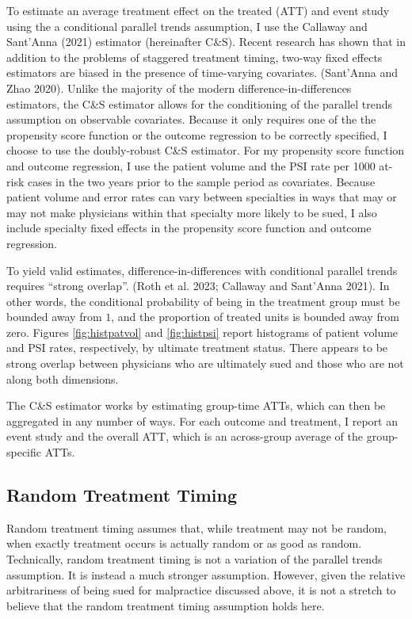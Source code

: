 \documentclass[
  12pt,
]{article}
\begin{document}
To estimate an average treatment effect on the treated (ATT) and event study using the a conditional parallel trends assumption, I use the Callaway and Sant'Anna (2021) estimator (hereinafter C\&S). Recent research has shown that in addition to the problems of staggered treatment timing, two-way fixed effects estimators are biased in the presence of time-varying covariates. (Sant'Anna and Zhao 2020). Unlike the majority of the modern difference-in-differences estimators, the C\&S estimator allows for the conditioning of the parallel trends assumption on observable covariates. Because it only requires one of the the propensity score function or the outcome regression to be correctly specified, I choose to use the doubly-robust C\&S estimator. For my propensity score function and outcome regression, I use the patient volume and the PSI rate per 1000 at-risk cases in the two years prior to the sample period as covariates. Because patient volume and error rates can vary between specialties in ways that may or may not make physicians within that specialty more likely to be sued, I also include specialty fixed effects in the propensity score function and outcome regression.

To yield valid estimates, difference-in-differences with conditional parallel trends requires ``strong overlap''. (Roth et al. 2023; Callaway and Sant'Anna 2021). In other words, the conditional probability of being in the treatment group must be bounded away from \(1\), and the proportion of treated units is bounded away from zero. Figures \ref{fig:histpatvol} and \ref{fig:histpsi} report histograms of patient volume and PSI rates, respectively, by ultimate treatment status. There appears to be strong overlap between physicians who are ultimately sued and those who are not along both dimensions.

The C\&S estimator works by estimating group-time ATTs, which can then be aggregated in any number of ways. For each outcome and treatment, I report an event study and the overall ATT, which is an across-group average of the group-specific ATTs.

\hypertarget{random-treatment-timing}{%
\subsection{Random Treatment Timing}\label{random-treatment-timing}}

Random treatment timing assumes that, while treatment may not be random, when exactly treatment occurs is actually random or as good as random. Technically, random treatment timing is not a variation of the parallel trends assumption. It is instead a much stronger assumption. However, given the relative arbitrariness of being sued for malpractice discussed above, it is not a stretch to believe that the random treatment timing assumption holds here.
\end{document}
